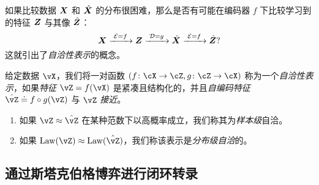 \documentclass[../../book-main.tex]{subfiles}
\begin{document}
如果比较数据 $\bm{X}$ 和 $\hat {\bm{X}}$ 的分布很困难，那么是否有可能在编码器 $f$ 下比较学习到的特征 $\bm{Z}$ 与其像 $\hat {\bm{Z}}$：
\begin{equation}
 \bm{X}
\xrightarrow{\hspace{1mm} \mathcal{E} = f \hspace{1mm}} \bm{Z}  \xrightarrow{\hspace{1mm} \mathcal{D} = g \hspace{1mm}} \hat{\bm{X}} \xrightarrow{\hspace{1mm} \mathcal{E} = f \hspace{1mm}} \hat {\bm{Z}}?
\label{eqn:closed-autoencoding}
\end{equation}
这就引出了{\em 自洽性表示}的概念。
\begin{definition}[自洽性表示]\label{def:closed_loop}
    给定数据 \(\vX\)，我们将一对函数 \((f \colon \cX \to \cZ, g \colon \cZ \to \cX)\) 称为一个\textit{自洽性表示}，如果\textit{特征} \(\vZ = f(\vX)\) 是紧凑且结构化的，并且\textit{自编码特征} \(\hat{\vZ} \doteq f \circ g(\vZ)\) 与 \(\vZ\) \textit{接近}。
    \begin{enumerate}
        \item 如果 \(\vZ \approx \hat{\vZ}\) 在某种范数下以高概率成立，我们称其为\textit{样本级}自洽。
        \item 如果 \(\Law(\vZ) \approx \Law(\hat{\vZ})\)，我们称该表示是\textit{分布级自洽}的。
    \end{enumerate}
\end{definition}



\subsection{通过斯塔克伯格博弈进行闭环转录}\label{sec:closed-loop-transcription}

\end{document}
